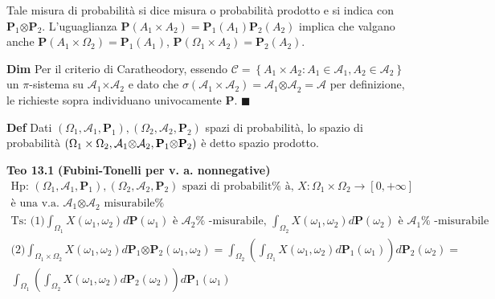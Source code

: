 \documentclass{article}
\begin{document}
Tale misura di probabilit\`{a} si dice misura o probabilit\`{a} prodotto e
si indica con $\mathbf{P}_{1}\mathcal{\otimes }\mathbf{P}_{2}$.
L'uguaglianza $\mathbf{P}\left( A_{1}\times A_{2}\right) =\mathbf{P}%
_{1}\left( A_{1}\right) \mathbf{P}_{2}\left( A_{2}\right) $ implica che
valgano anche $\mathbf{P}\left( A_{1}\times \Omega _{2}\right) =\mathbf{P}%
_{1}\left( A_{1}\right) $, $\mathbf{P}\left( \Omega _{1}\times A_{2}\right) =%
\mathbf{P}_{2}\left( A_{2}\right) $.

\textbf{Dim} Per il criterio di Caratheodory, essendo $\mathcal{C}=\left\{
A_{1}\times A_{2}:A_{1}\in \mathcal{A}_{1},A_{2}\in \mathcal{A}_{2}\right\} $
un $\pi $-sistema su $\mathcal{A}_{1}\mathcal{\times A}_{2}$ e dato che $%
\sigma \left( \mathcal{A}_{1}\times \mathcal{A}_{2}\right) =\mathcal{A}_{1}%
\mathcal{\otimes A}_{2}=\mathcal{A}$ per definizione, le richieste sopra
individuano univocamente $\mathbf{P}$. $\blacksquare $

\textbf{Def} Dati $\left( \Omega _{1},\mathcal{A}_{1},\mathbf{P}_{1}\right)
,\left( \Omega _{2},\mathcal{A}_{2},\mathbf{P}_{2}\right) $ spazi di
probabilit\`{a}, lo spazio di probabilit\`{a} $\left( \Omega _{1}\times
\Omega _{2},\mathcal{A}_{1}\mathcal{\otimes A}_{2},\mathbf{P}_{1}\mathcal{%
\otimes }\mathbf{P}_{2}\right) $ \`{e} detto spazio prodotto.

\textbf{Teo 13.1} \textbf{(Fubini-Tonelli per v. a. nonnegative)}%
\begin{gather*}
\text{Hp: }\left( \Omega _{1},\mathcal{A}_{1},\mathbf{P}_{1}\right) ,\left(
\Omega _{2},\mathcal{A}_{2},\mathbf{P}_{2}\right) \text{ spazi di probabilit%
\`{a}, }X:\Omega _{1}\times \Omega _{2}\rightarrow \left[ 0,+\infty \right]
\\
\text{\`{e} una v.a. }\mathcal{A}_{1}\mathcal{\otimes A}_{2}\text{ misurabile%
} \\
\text{Ts: (1)}\int_{\Omega _{1}}X\left( \omega _{1},\omega _{2}\right) d%
\mathbf{P}\left( \omega _{1}\right) \text{ \`{e} }\mathcal{A}_{2}\text{%
-misurabile, }\int_{\Omega _{2}}X\left( \omega _{1},\omega _{2}\right) d%
\mathbf{P}\left( \omega _{2}\right) \text{ \`{e} }\mathcal{A}_{1}\text{%
-misurabile} \\
\text{(2)}\int_{\Omega _{1}\times \Omega _{2}}X\left( \omega _{1},\omega
_{2}\right) d\mathbf{P}_{1}\mathcal{\otimes }\mathbf{P}_{2}\left( \omega
_{1},\omega _{2}\right) =\int_{\Omega _{2}}\left( \int_{\Omega _{1}}X\left(
\omega _{1},\omega _{2}\right) d\mathbf{P}_{1}\left( \omega _{1}\right)
\right) d\mathbf{P}_{2}\left( \omega _{2}\right) = \\
\int_{\Omega _{1}}\left( \int_{\Omega _{2}}X\left( \omega _{1},\omega
_{2}\right) d\mathbf{P}_{2}\left( \omega _{2}\right) \right) d\mathbf{P}%
_{1}\left( \omega _{1}\right)
\end{gather*}
\end{document}
